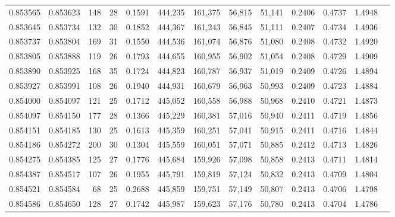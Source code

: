 \begin{tabular}{rrrrrrrrrrrrr}
0.853565 & 0.853623 &   148 &  28 &                                     0.1591 & 444,235 & 161,375 &  56,815 &  51,141 & 0.2406 & 0.4737 & 1.4948 \\
0.853645 & 0.853734 &   132 &  30 &                                     0.1852 & 444,367 & 161,243 &  56,845 &  51,111 & 0.2407 & 0.4734 & 1.4936 \\
0.853737 & 0.853804 &   169 &  31 &                                     0.1550 & 444,536 & 161,074 &  56,876 &  51,080 & 0.2408 & 0.4732 & 1.4920 \\
0.853805 & 0.853888 &   119 &  26 &                                     0.1793 & 444,655 & 160,955 &  56,902 &  51,054 & 0.2408 & 0.4729 & 1.4909 \\
0.853890 & 0.853925 &   168 &  35 &                                     0.1724 & 444,823 & 160,787 &  56,937 &  51,019 & 0.2409 & 0.4726 & 1.4894 \\
0.853927 & 0.853991 &   108 &  26 &                                     0.1940 & 444,931 & 160,679 &  56,963 &  50,993 & 0.2409 & 0.4723 & 1.4884 \\
0.854000 & 0.854097 &   121 &  25 &                                     0.1712 & 445,052 & 160,558 &  56,988 &  50,968 & 0.2410 & 0.4721 & 1.4873 \\
0.854097 & 0.854150 &   177 &  28 &                                     0.1366 & 445,229 & 160,381 &  57,016 &  50,940 & 0.2411 & 0.4719 & 1.4856 \\
0.854151 & 0.854185 &   130 &  25 &                                     0.1613 & 445,359 & 160,251 &  57,041 &  50,915 & 0.2411 & 0.4716 & 1.4844 \\
0.854186 & 0.854272 &   200 &  30 &                                     0.1304 & 445,559 & 160,051 &  57,071 &  50,885 & 0.2412 & 0.4713 & 1.4826 \\
0.854275 & 0.854385 &   125 &  27 &                                     0.1776 & 445,684 & 159,926 &  57,098 &  50,858 & 0.2413 & 0.4711 & 1.4814 \\
0.854387 & 0.854517 &   107 &  26 &                                     0.1955 & 445,791 & 159,819 &  57,124 &  50,832 & 0.2413 & 0.4709 & 1.4804 \\
0.854521 & 0.854584 &    68 &  25 &                                     0.2688 & 445,859 & 159,751 &  57,149 &  50,807 & 0.2413 & 0.4706 & 1.4798 \\
0.854586 & 0.854650 &   128 &  27 &                                     0.1742 & 445,987 & 159,623 &  57,176 &  50,780 & 0.2413 & 0.4704 & 1.4786 \\

\end{tabular}

